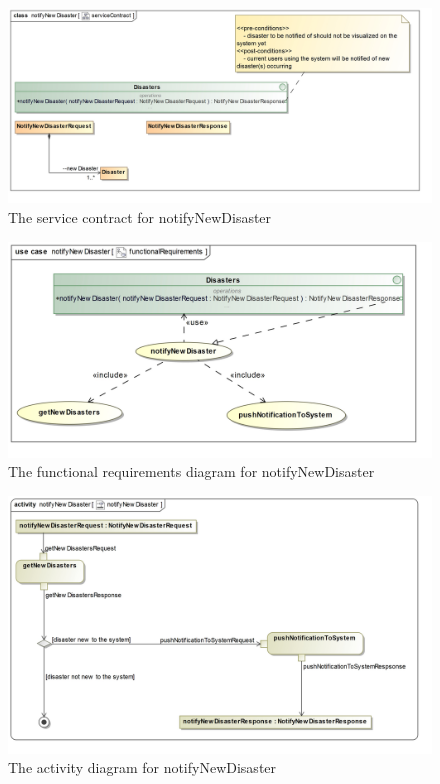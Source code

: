 \begin{figure}[H]
	\includegraphics[scale=0.2]{../images/funcReq/notifyNewDisasterServiceContract.jpg}
	\caption{The service contract for notifyNewDisaster \label{overflow}}
\end{figure}

\begin{figure}[H]
	\centering
	\includegraphics[width=1.2\textwidth]{../images/funcReq/notifyNewDisasterFunctionalRequirements.jpg}
	\caption{The functional requirements diagram for notifyNewDisaster \label{overflow}}
\end{figure}

\begin{figure}[H]
	\centering
	\includegraphics[scale=0.22]{../images/funcReq/notifyNewDisasterActivityDiagram.jpg}
	\caption{The activity diagram for notifyNewDisaster \label{overflow}}
\end{figure} 

